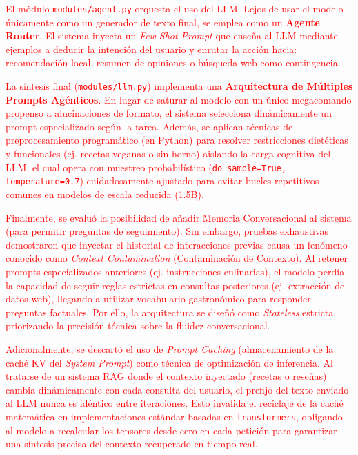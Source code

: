 \documentclass[11pt,a4paper]{article}
\begin{document}
\textcolor{red}{El módulo \texttt{modules/agent.py} orquesta el uso del LLM. Lejos de usar el modelo únicamente como un generador de texto final, se emplea como un \textbf{Agente Router}. El sistema inyecta un \textit{Few-Shot Prompt} que enseña al LLM mediante ejemplos a deducir la intención del usuario y enrutar la acción hacia: recomendación local, resumen de opiniones o búsqueda web como contingencia.}

\textcolor{red}{La síntesis final (\texttt{modules/llm.py}) implementa una \textbf{Arquitectura de Múltiples Prompts Agénticos}. En lugar de saturar al modelo con un único megacomando propenso a alucinaciones de formato, el sistema selecciona dinámicamente un prompt especializado según la tarea. Además, se aplican técnicas de preprocesamiento programático (en Python) para resolver restricciones dietéticas y funcionales (ej. recetas veganas o sin horno) aislando la carga cognitiva del LLM, el cual opera con muestreo probabilístico (\texttt{do\_sample=True, temperature=0.7}) cuidadosamente ajustado para evitar bucles repetitivos comunes en modelos de escala reducida (1.5B).}

\textcolor{red}{Finalmente, se evaluó la posibilidad de añadir Memoria Conversacional al sistema (para permitir preguntas de seguimiento). Sin embargo, pruebas exhaustivas demostraron que inyectar el historial de interacciones previas causa un fenómeno conocido como \textit{Context Contamination} (Contaminación de Contexto). Al retener prompts especializados anteriores (ej. instrucciones culinarias), el modelo perdía la capacidad de seguir reglas estrictas en consultas posteriores (ej. extracción de datos web), llegando a utilizar vocabulario gastronómico para responder preguntas factuales. Por ello, la arquitectura se diseñó como \textit{Stateless} estricta, priorizando la precisión técnica sobre la fluidez conversacional.}

\textcolor{red}{Adicionalmente, se descartó el uso de \textit{Prompt Caching} (almacenamiento de la caché KV del \textit{System Prompt}) como técnica de optimización de inferencia. Al tratarse de un sistema RAG donde el contexto inyectado (recetas o reseñas) cambia dinámicamente con cada consulta del usuario, el prefijo del texto enviado al LLM nunca es idéntico entre iteraciones. Esto invalida el reciclaje de la caché matemática en implementaciones estándar basadas en \texttt{transformers}, obligando al modelo a recalcular los tensores desde cero en cada petición para garantizar una síntesis precisa del contexto recuperado en tiempo real.}
\end{document}
